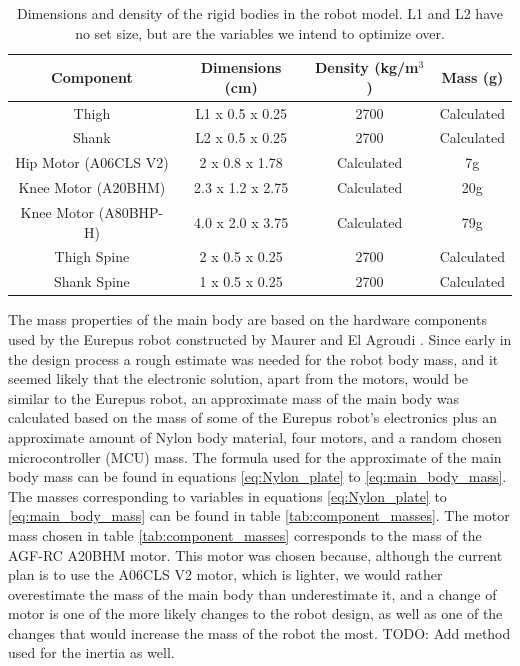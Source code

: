 \begin{table}
\centering
\begin{tabular}{|c|c|c|c|}
\hline
\textbf{Component} & \textbf{Dimensions (cm)} & \textbf{Density (kg/m$^3$)} & \textbf{Mass (g)}\\
\hline
Thigh & L1 x 0.5 x 0.25 & 2700 & Calculated \\
Shank & L2 x 0.5 x 0.25 & 2700 & Calculated \\
Hip Motor (A06CLS V2) & 2 x 0.8 x 1.78 & Calculated &  7g \\
Knee Motor (A20BHM) & 2.3 x 1.2 x 2.75 & Calculated & 20g \\
Knee Motor (A80BHP-H) & 4.0 x 2.0 x 3.75 & Calculated & 79g \\
Thigh Spine & 2 x 0.5 x 0.25 & 2700 & Calculated \\
Shank Spine & 1 x 0.5 x 0.25 & 2700 & Calculated \\
\hline
\end{tabular}
\caption{Dimensions and density of the rigid bodies in the robot model. L1 and L2 have no set size, but are the variables we intend to optimize over. }
\label{tab:mass_geometry_properties}
\end{table}

The mass properties of the main body are based on the hardware components used by the Eurepus robot constructed by Maurer and El Agroudi \cite{finn_tarek_master}. Since early in the design process a rough estimate was needed for the robot body mass, and it seemed likely that the electronic solution, apart from the motors, would be similar to the Eurepus robot, an approximate mass of the main body was calculated based on the mass of some of the Eurepus robot's electronics plus an approximate amount of Nylon body material, four motors, and a random chosen microcontroller (MCU) mass. The formula used for the approximate of the main body mass can be found in equations \ref{eq:Nylon_plate} to \ref{eq:main_body_mass}. The masses corresponding to variables in equations \ref{eq:Nylon_plate} to \ref{eq:main_body_mass} can be found in table \ref{tab:component_masses}. The motor mass chosen in table \ref{tab:component_masses} corresponds to the mass of the AGF-RC A20BHM motor. This motor was chosen because, although the current plan is to use the A06CLS V2 motor, which is lighter, we would rather overestimate the mass of the main body than underestimate it, and a change of motor is one of the more likely changes to the robot design, as well as one of the changes that would increase the mass of the robot the most. TODO: Add method used for the inertia as well. 

